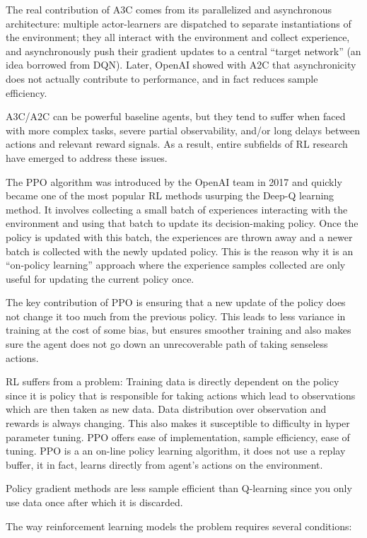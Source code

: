\documentclass[conference]{IEEEtran}
\begin{document}
The real contribution of A3C comes from its parallelized and asynchronous architecture: multiple actor-learners are dispatched to separate instantiations of the environment; they all interact with the environment and collect experience, and asynchronously push their gradient updates to a central “target network” (an idea borrowed from DQN). Later, OpenAI showed with A2C that asynchronicity does not actually contribute to performance, and in fact reduces sample efficiency.

A3C/A2C can be powerful baseline agents, but they tend to suffer when faced with more complex tasks, severe partial observability, and/or long delays between actions and relevant reward signals. As a result, entire subfields of RL research have emerged to address these issues.

The PPO algorithm was introduced by the OpenAI team in 2017 and quickly became one of the most popular RL methods usurping the Deep-Q learning method. It involves collecting a small batch of experiences interacting with the environment and using that batch to update its decision-making policy. Once the policy is updated with this batch, the experiences are thrown away and a newer batch is collected with the newly updated policy. This is the reason why it is an “on-policy learning” approach where the experience samples collected are only useful for updating the current policy once.

The key contribution of PPO is ensuring that a new update of the policy does not change it too much from the previous policy. This leads to less variance in training at the cost of some bias, but ensures smoother training and also makes sure the agent does not go down an unrecoverable path of taking senseless actions.

RL suffers from a problem: Training data is directly dependent on the policy since it is policy that is responsible for taking actions which lead to observations which are then taken as new data. Data distribution over observation and rewards is always changing. This also makes it susceptible to difficulty in hyper parameter tuning. PPO offers ease of implementation, sample efficiency, ease of tuning. PPO is a an on-line policy learning algorithm, it does not use a replay buffer, it in fact,  learns directly from agent’s actions on the environment.

Policy gradient methods are less sample efficient than Q-learning since you only use data once after which it is discarded.

The way reinforcement learning models the problem requires several conditions:
\end{document}
